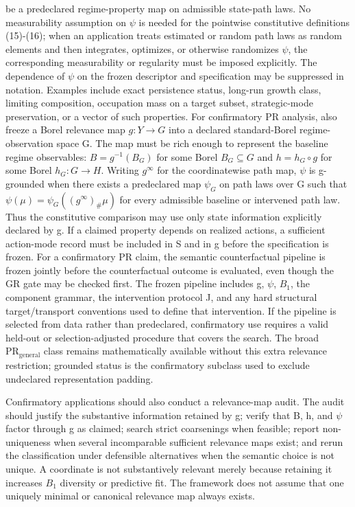 \documentclass[10pt]{article}
\newcommand{\push}{\mathord{\#}}
\begin{document}
be a predeclared regime-property map on admissible state-path laws. No
measurability assumption on \(\psi\) is needed for the pointwise
constitutive definitions (15)-(16); when an application treats estimated
or random path laws as random elements and then integrates, optimizes,
or otherwise randomizes \(\psi\), the corresponding measurability or
regularity must be imposed explicitly. The dependence of \(\psi\) on the
frozen descriptor and specification may be suppressed in notation.
Examples include exact persistence status, long-run growth class,
limiting composition, occupation mass on a target subset, strategic-mode
preservation, or a vector of such properties. For confirmatory PR
analysis, also freeze a Borel relevance map \(g:Y\to{}G\) into a
declared standard-Borel regime-observation space G. The map must be rich
enough to represent the baseline regime observables: \(B=g^{-1}(B_G)\)
for some Borel \(B_G\subseteq{}G\) and \(h=h_G\circ{}g\) for some Borel
\(h_G:G\to{}H\). Writing \(g^\infty\) for the coordinatewise path map,
\(\psi\) is g-grounded when there exists a predeclared map \(\psi_G\) on
path laws over G such that \(\psi(\mu)=\psi_G((g^\infty)_{\push}\mu)\)
for every admissible baseline or intervened path law. Thus the
constitutive comparison may use only state information explicitly
declared by g. If a claimed property depends on realized actions, a
sufficient action-mode record must be included in S and in g before the
specification is frozen. For a confirmatory PR claim, the semantic
counterfactual pipeline is frozen jointly before the counterfactual
outcome is evaluated, even though the GR gate may be checked first. The
frozen pipeline includes g, \(\psi\), \(B_1\), the component grammar,
the intervention protocol J, and any hard structural target/transport
conventions used to define that intervention. If the pipeline is
selected from data rather than predeclared, confirmatory use requires a
valid held-out or selection-adjusted procedure that covers the search.
The broad \(\mathrm{PR}_{\mathrm{general}}\) class remains
mathematically available without this extra relevance restriction;
grounded status is the confirmatory subclass used to exclude undeclared
representation padding.

Confirmatory applications should also conduct a relevance-map audit. The
audit should justify the substantive information retained by g; verify
that B, h, and \(\psi\) factor through g as claimed; search strict
coarsenings when feasible; report non-uniqueness when several
incomparable sufficient relevance maps exist; and rerun the
classification under defensible alternatives when the semantic choice is
not unique. A coordinate is not substantively relevant merely because
retaining it increases \(B_1\) diversity or predictive fit. The
framework does not assume that one uniquely minimal or canonical
relevance map always exists.
\end{document}
